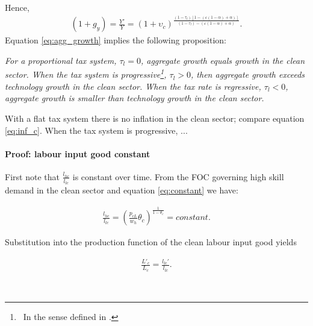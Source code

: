 Hence, 
\begin{align}\label{eq:agg_growth}
(1+g_y)=\frac{Y'}{Y}=(1+\upsilon_{c})^\frac{(1-\tau_l)[1-(\varepsilon(1-\alpha)+\alpha)]}{(1-\tau_l)-(\varepsilon(1-\alpha)+\alpha)}.
\end{align}
Equation \ref{eq:agg_growth} implies the following proposition:
\begin{prop}
	\textit{For a proportional tax system, $\tau_l=0$, aggregate growth equals growth in the clean sector. 
		When the tax system is progressive\footnote{\ In the sense defined in \cite{Heathcote2017OptimalFramework}.}, $\tau_l>0$, then aggregate growth exceeds technology growth in the clean sector. When the tax rate is regressive, $\tau_l<0$, aggregate growth is smaller than technology growth in the clean sector. }
\end{prop}
With a flat tax system there is no inflation in the clean sector; compare equation \ref{eq:inf_c}. When the tax system is progressive, ...

\paragraph{Proof: labour input good constant}

First note that $\frac{l_{hc}}{l_{lc}}$ is constant over time. 
From the FOC governing high skill demand in the clean sector and equation \ref{eq:constant} we have:

\begin{align*}
\frac{l_{hc}}{l_{lc}}=\left(\frac{p_{cL}}{w_h}\theta_c\right)^{\frac{1}{1-\theta_c}}= constant.
\end{align*}

Substitution into the production function of the clean labour input good yields

\begin{align*}
\frac{L'_c}{L_c}=\frac{l_{lc}'}{l_{lc}}.
\end{align*}


\textbf{}
\\

